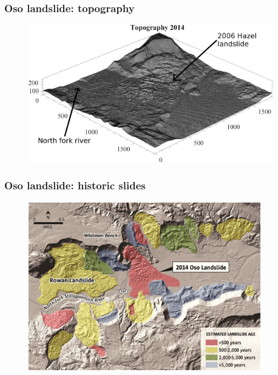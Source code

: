 \documentclass[notes]{beamer}
\begin{document}
\begin{frame}
	\frametitle{Oso landslide: topography}
	\begin{figure}
		\includegraphics[width=0.95\textwidth]{figs/oso/topography-2014.png}
	\end{figure}
\end{frame}

\begin{frame}
	\frametitle{Oso landslide: historic slides}
	\begin{figure}
		\includegraphics[width=0.9\textwidth]{figs/oso/past-slides.png}
	\end{figure}
\end{frame}
\end{document}
